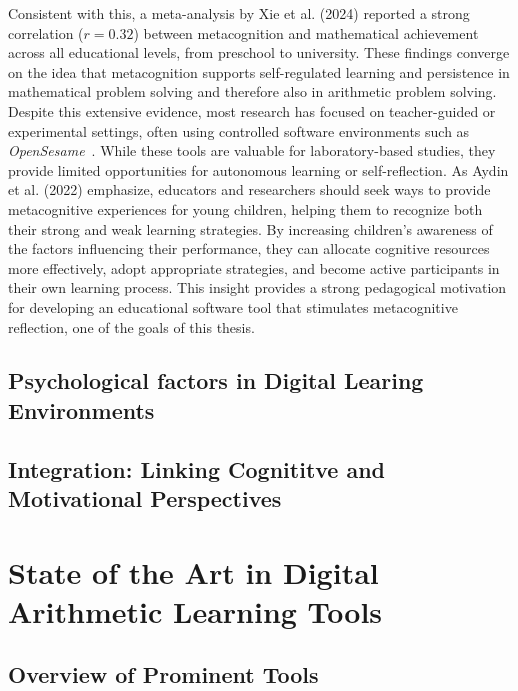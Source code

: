 Consistent with this, a meta-analysis by Xie et al. (2024) \cite{xie_meta_2024} reported a strong correlation ($r = 0.32$) between metacognition and mathematical achievement across all educational levels, from preschool to university.
These findings converge on the idea that metacognition supports self-regulated learning and persistence in mathematical problem solving and therefore also in arithmetic problem solving.\\
Despite this extensive evidence, most research has focused on teacher-guided or experimental settings, often using controlled software environments such as \textit{OpenSesame}~\cite{mathot_opensesame_2012}.
While these tools are valuable for laboratory-based studies, they provide limited opportunities for autonomous learning or self-reflection.
As Aydin et al. (2022) \cite{aydin_i_2022_new} emphasize, educators and researchers should seek ways to provide metacognitive experiences for young children, helping them to recognize both their strong and weak learning strategies. 
By increasing children's awareness of the factors influencing their performance, they can allocate cognitive resources more effectively, adopt appropriate strategies, and become active participants in their own learning process. 
This insight provides a strong pedagogical motivation for developing an educational software tool that stimulates metacognitive reflection, one of the goals of this thesis.




\subsection{Psychological factors in Digital Learing Environments}
\subsection{Integration: Linking Cognititve and Motivational Perspectives}
\section{State of the Art in Digital Arithmetic Learning Tools}
\subsection{Overview of Prominent Tools}


